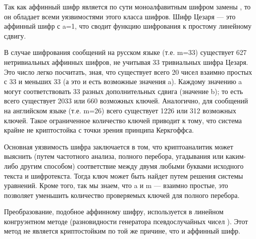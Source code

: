 Так как аффинный шифр является по сути моноалфавитным шифром замены
, то он обладает всеми уязвимостями этого класса шифров. Шифр Цезаря 
— это аффинный шифр с a=1, что сводит функцию шифрования к простому 
линейному сдвигу.

В случае шифрования сообщений на русском языке (т.е. m=33) существует 
627 нетривиальных аффинных шифров, не учитывая 33 тривиальных шифра 
Цезаря. Это число легко посчитать, зная, что существует всего 20 чисел 
взаимно простых с 33 и меньших 33 (а это и есть возможные значения 
a). Каждому значению a могут соответствовать 33 разных дополнительных 
сдвига (значение b); то есть всего существует 2033 или 660 возможных 
ключей. Аналогично, для сообщений на английском языке (т.е. m=26) 
всего существует 1226 или 312 возможных ключей. Такое ограниченное 
количество ключей приводит к тому, что система крайне не криптостойка 
с точки зрения принципа Керкгоффса.

Основная уязвимость шифра заключается в том, что криптоаналитик может 
выяснить (путем частотного анализа, полного перебора, угадывания или 
каким-либо другим способом) соответствие между двумя любыми буквами 
исходного текста и шифротекста. Тогда ключ может быть найдет путем 
решения системы уравнений. Кроме того, так мы знаем, что a и m — взаимно 
простые, это позволяет уменьшить количество проверяемых ключей для 
полного перебора.

Преобразование, подобное аффинному шифру, используется в линейном 
конгруэнтном методе (разновидности генератора псевдослучайных чисел
). Этот метод не является криптостойким по той же причине, что и аффинный 
шифр.

